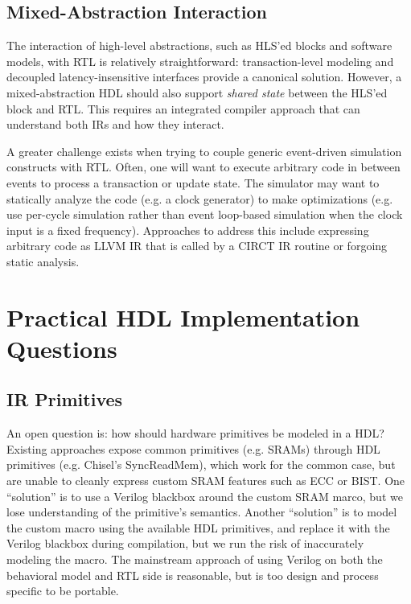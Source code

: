 \documentclass[sigplan,review,nonacm,9pt]{acmart}
\begin{document}
\subsection{Mixed-Abstraction Interaction}

The interaction of high-level abstractions, such as HLS'ed blocks and software models, with RTL is relatively straightforward: transaction-level modeling and decoupled latency-insensitive interfaces provide a canonical solution\cite{umoc}.
However, a mixed-abstraction HDL should also support \textit{shared state} between the HLS'ed block and RTL.
This requires an integrated compiler approach that can understand both IRs and how they interact.

A greater challenge exists when trying to couple generic event-driven simulation constructs with RTL.
Often, one will want to execute arbitrary code in between events to process a transaction or update state.
The simulator may want to statically analyze the code (e.g. a clock generator) to make optimizations (e.g. use per-cycle simulation rather than event loop-based simulation when the clock input is a fixed frequency).
Approaches to address this include expressing arbitrary code as LLVM IR that is called by a CIRCT IR routine or forgoing static analysis.

\section{Practical HDL Implementation Questions}


\subsection{IR Primitives}


An open question is: how should hardware primitives be modeled in a HDL?
Existing approaches expose common primitives (e.g. SRAMs) through HDL primitives (e.g. Chisel's SyncReadMem), which work for the common case, but are unable to cleanly express custom SRAM features such as ECC or BIST.
One ``solution'' is to use a Verilog blackbox around the custom SRAM marco, but we lose understanding of the primitive's semantics.
Another ``solution'' is to model the custom macro using the available HDL primitives, and replace it with the Verilog blackbox during compilation, but we run the risk of inaccurately modeling the macro.
The mainstream approach of using Verilog on both the behavioral model and RTL side is reasonable, but is too design and process specific to be portable.
\end{document}

